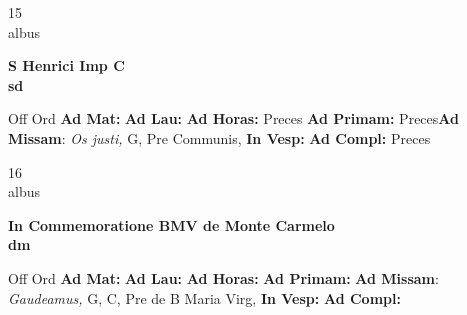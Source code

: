 \documentclass[10pt, openany]{book}
\begin{document}
    \begin{center}
        \begin{minipage}{3.5in}
            \vspace{2em}
            \begin{minipage}{0.5in}
                {\Huge 15} \\
                {\normalsize albus}
            \end{minipage}
            \begin{minipage}{3.0in}
                \textbf{ \large S Henrici Imp C \\
                \textnormal{\normalsize sd}}

            \end{minipage}
            \begin{justify}Off Ord
                \textbf{Ad Mat: }
                \textbf{Ad Lau: }
                \textbf{Ad Horas: }Preces
                \textbf{Ad Primam: }Preces\textbf{Ad Missam}: \textit{Os justi,} G, Pre Communis, 
                \textbf{In Vesp: }
                \textbf{Ad Compl: }Preces
            \end{justify}
        \end{minipage}
    \end{center}

    \begin{center}
        \begin{minipage}{3.5in}
            \vspace{2em}
            \begin{minipage}{0.5in}
                {\Huge 16} \\
                {\normalsize albus}
            \end{minipage}
            \begin{minipage}{3.0in}
                \textbf{ \large In Commemoratione BMV de Monte Carmelo \\
                \textnormal{\normalsize dm}}

            \end{minipage}
            \begin{justify}Off Ord
                \textbf{Ad Mat: }
                \textbf{Ad Lau: }
                \textbf{Ad Horas: }
                \textbf{Ad Primam: }\textbf{Ad Missam}: \textit{Gaudeamus,} G, C, Pre  de B Maria Virg, 
                \textbf{In Vesp: }
                \textbf{Ad Compl: }
            \end{justify}
        \end{minipage}
    \end{center}
\end{document}
